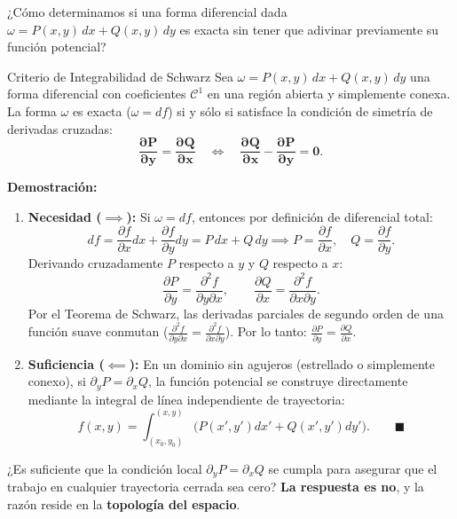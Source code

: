 \documentclass[11pt,letterpaper]{article}
\begin{document}
¿Cómo determinamos si una forma diferencial dada $\omega = P(x,y)\,dx + Q(x,y)\,dy$ es exacta sin tener que adivinar previamente su función potencial?

\begin{theorembox}{Criterio de Integrabilidad de Schwarz}
Sea $\omega = P(x, y)\,dx + Q(x, y)\,dy$ una forma diferencial con coeficientes $\mathcal{C}^1$ en una región abierta y simplemente conexa. La forma $\omega$ es exacta ($\omega = df$) si y sólo si satisface la condición de simetría de derivadas cruzadas:
\[
\mathbf{\frac{\partial P}{\partial y} = \frac{\partial Q}{\partial x} \quad \Longleftrightarrow \quad \frac{\partial Q}{\partial x} - \frac{\partial P}{\partial y} = 0}.
\]
\end{theorembox}

\textbf{Demostración:}
\begin{enumerate}
    \item \textbf{Necesidad ($\implies$):} Si $\omega = df$, entonces por definición de diferencial total:
    \[
    df = \frac{\partial f}{\partial x} dx + \frac{\partial f}{\partial y} dy = P\,dx + Q\,dy \implies P = \frac{\partial f}{\partial x}, \quad Q = \frac{\partial f}{\partial y}.
    \]
    Derivando cruzadamente $P$ respecto a $y$ y $Q$ respecto a $x$:
    \[
    \frac{\partial P}{\partial y} = \frac{\partial^2 f}{\partial y \partial x}, \qquad \frac{\partial Q}{\partial x} = \frac{\partial^2 f}{\partial x \partial y}.
    \]
    Por el Teorema de Schwarz, las derivadas parciales de segundo orden de una función suave conmutan ($\frac{\partial^2 f}{\partial y \partial x} = \frac{\partial^2 f}{\partial x \partial y}$). Por lo tanto: $\frac{\partial P}{\partial y} = \frac{\partial Q}{\partial x}$.
    \item \textbf{Suficiencia ($\impliedby$):} En un dominio sin agujeros (estrellado o simplemente conexo), si $\partial_y P = \partial_x Q$, la función potencial se construye directamente mediante la integral de línea independiente de trayectoria:
    \[
    f(x, y) = \int_{(x_0, y_0)}^{(x, y)} \big(P(x', y')dx' + Q(x', y')dy'\big). \qquad \blacksquare
    \]
\end{enumerate}

¿Es suficiente que la condición local $\partial_y P = \partial_x Q$ se cumpla para asegurar que el trabajo en cualquier trayectoria cerrada sea cero? \textbf{La respuesta es no}, y la razón reside en la \textbf{topología del espacio}.
\end{document}
